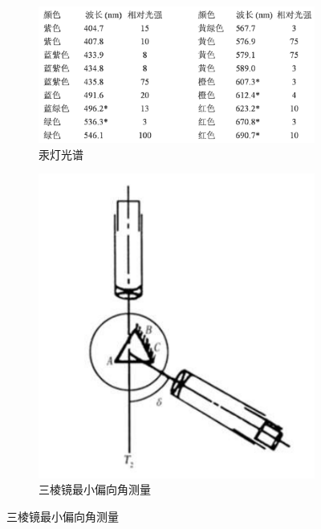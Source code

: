 \documentclass{article}
\begin{document}
\begin{figure}[H]
  \centering
  \begin{subfigure}{.65\textwidth}
    \centering
    \includegraphics[width=\linewidth]{figures/汞灯光谱}
    \caption{汞灯光谱}
  \end{subfigure}
  \begin{subfigure}{.3\textwidth}
    \centering
    \includegraphics[width=\linewidth]{figures/三棱镜最小偏向角测量}
    \caption{三棱镜最小偏向角测量}
  \end{subfigure}
\end{figure}
\end{document}
